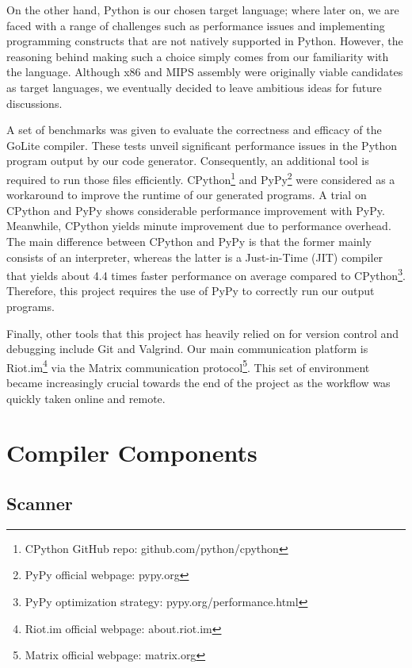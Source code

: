 \documentclass{article}
\begin{document}
On the other hand, Python is our chosen target language; where later on, we are faced with a range of challenges such as performance issues and implementing programming constructs that are not natively supported in Python. However, the reasoning behind making such a choice simply comes from our familiarity with the language. Although x86 and MIPS assembly were originally viable candidates as target languages, we eventually decided to leave ambitious ideas for future discussions.

A set of benchmarks was given to evaluate the correctness and efficacy of the GoLite compiler. These tests unveil significant performance issues in the Python program output by our code generator. Consequently, an additional tool is required to run those files efficiently. CPython\footnote{CPython GitHub repo: github.com/python/cpython} and PyPy\footnote{PyPy official webpage: pypy.org} were considered as a workaround to improve the runtime of our generated programs. A trial on CPython and PyPy shows considerable performance improvement with PyPy. Meanwhile, CPython yields minute improvement due to performance overhead. The main difference between CPython and PyPy is that the former mainly consists of an interpreter, whereas the latter is a Just-in-Time (JIT) compiler that yields about 4.4 times faster performance on average compared to CPython\footnote{PyPy optimization strategy: pypy.org/performance.html}. Therefore, this project requires the use of PyPy to correctly run our output programs.

Finally, other tools that this project has heavily relied on for version control and debugging include Git and Valgrind. Our main communication platform is Riot.im\footnote{Riot.im official webpage: about.riot.im} via the Matrix communication protocol\footnote{Matrix official webpage: matrix.org}. This set of environment became increasingly crucial towards the end of the project as the workflow was quickly taken online and remote.

\section{Compiler Components}

\subsection{Scanner}
\end{document}
